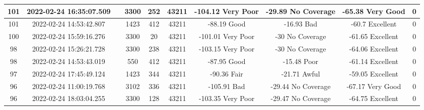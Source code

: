 \begin{longtable*}{|c|c|c|c|c|c|c|c|c|c|}
101&2022-02-24 16:35:07.509&&3300&252&43211& -104.12   Very Poor   & -29.89    No Coverage & -65.38    Very Good   & 0\\\hline
{}101&2022-02-24 14:53:42.807&&1423&412&43211& -88.19    Good        & -16.93    Bad         & -60.7     Excellent   & 0\\\hline
{}100&2022-02-24 15:59:16.276&&3300&20&43211& -101.01   Very Poor   & -30       No Coverage & -61.65    Excellent   & 0\\\hline
{}98&2022-02-24 15:26:21.728&&3300&238&43211& -103.15   Very Poor   & -30       No Coverage & -64.06    Excellent   & 0\\\hline
{}98&2022-02-24 14:53:43.019&&550&412&43211& -87.95    Good        & -15.48    Poor        & -61.14    Excellent   & 0\\\hline
{}97&2022-02-24 17:45:49.124&&1423&344&43211& -90.36    Fair        & -21.71    Awful       & -59.05    Excellent   & 0\\\hline
{}96&2022-02-24 11:00:19.768&&3102&336&43211& -105.91   Bad         & -29.44    No Coverage & -67.17    Very Good   & 0\\\hline
{}96&2022-02-24 18:03:04.255&&3300&128&43211& -103.35   Very Poor   & -29.47    No Coverage & -64.75    Excellent   & 0\\\hline

\end{longtable*}
